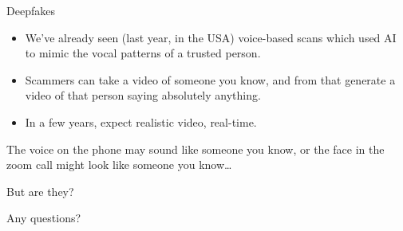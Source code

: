 \documentclass[xcolor=table]{beamer}
\begin{document}
\begin{frame}{Deepfakes}
	\begin{itemize}
		\item We've already seen (last year, in the USA) voice-based scans which used AI to mimic the vocal patterns of a trusted person.
		\item Scammers can take a video of someone you know, and from that generate a video of that person saying absolutely anything.
		\item In a few years, expect realistic video, real-time. 
	\end{itemize}

	The voice on the phone may sound like someone you know, or the face in the zoom call might look like someone you know\ldots 

	\vspace{0.5em}

	But are they?
\end{frame}


\begin{frame}{Any questions?}
\end{frame}
\end{document}
